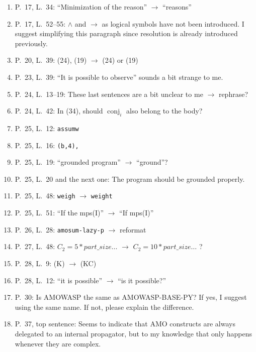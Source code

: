 \documentclass[11pt]{article}
\theoremstyle{definition}
\begin{document}
\begin{enumerate}
    \item P.~17, L.~34: ``Minimization of the reason'' $\rightarrow$ ``reasons''
    \item P.~17, L.~52--55: $\wedge$ and $\rightarrow$ as logical symbols have not been introduced. I suggest simplifying this paragraph since resolution is already introduced previously.
    \item P.~20, L.~39: (24), (19) $\rightarrow$ (24) or (19)
    \item P.~23, L.~39: ``It is possible to observe'' sounds a bit strange to me.
    \item P.~24, L.~13--19: These last sentences are a bit unclear to me $\rightarrow$ rephrase?
    \item P.~24, L.~42: In (34), should $\operatorname{conj}_i$ also belong to the body?
    \item P.~25, L.~12: \texttt{assumw}    
    \item P.~25, L.~16: \texttt{(b,4),}
    \item P.~25, L.~19: ``grounded program'' $\rightarrow$ ``ground''?
    \item P.~25, L.~20 and the next one: The program should be grounded properly.
    \item P.~25, L.~48: \texttt{weigh} $\rightarrow$ \texttt{weight}
    \item P.~25, L.~51: ``If the mps(I)'' $\rightarrow$ ``If mps(I)''
    \item P.~26, L.~28: \texttt{amosum-lazy-p} $\rightarrow$ reformat
    \item P.~27, L.~48: $C_2 = 5 * part\_size \ldots$ $\rightarrow$ $C_2 = 10 * part\_size \ldots$ ?
    \item P.~28, L.~9: (K) $\rightarrow$ (KC)

    
    \item P.~28, L.~12: ``it is possible'' $\rightarrow$ ``is it possible?''
    \item P.~30: Is AMOWASP the same as AMOWASP-BASE-PY? If yes, I suggest using the same name. If not, please explain the difference.
    \item P.~37, top sentence: Seems to indicate that AMO constructs are always delegated to an internal propagator, but to my knowledge that only happens whenever they are complex.
   
\end{enumerate}
\end{document}
